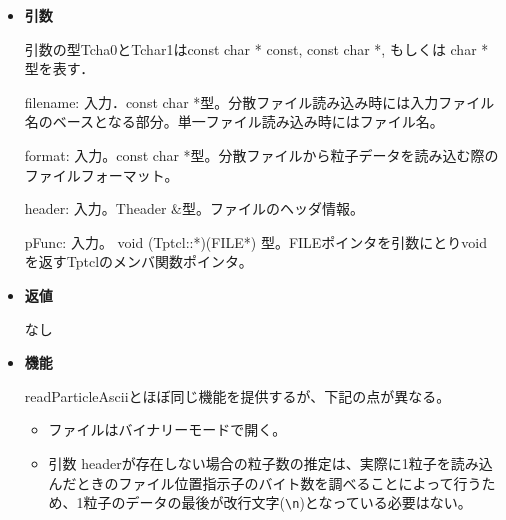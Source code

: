 \begin{itemize}

\item {\bf 引数}

引数の型Tcha0とTchar1はconst char * const, const char *, もしくは char
* 型を表す．

filename: 入力．const char *型。分散ファイル読み込み時には入力ファイル
名のベースとなる部分。単一ファイル読み込み時にはファイル名。

format: 入力。const char *型。分散ファイルから粒子データを読み込む際の
ファイルフォーマット。

header: 入力。Theader \&型。ファイルのヘッダ情報。

pFunc: 入力。 void (Tptcl::*)(FILE*) 型。FILEポインタを引数にとりvoid
を返すTptclのメンバ関数ポインタ。


\item {\bf 返値}

なし

\item {\bf 機能}

readParticleAsciiとほぼ同じ機能を提供するが、下記の点が異なる。
\begin{itemize}
\item ファイルはバイナリーモードで開く。
\item 引数 headerが存在しない場合の粒子数の推定は、実際に1粒子を読み込んだときのファイル位置指示子のバイト数を調べることによって行うため、1粒子のデータの最後が改行文字(\texttt{\textbackslash n})となっている必要はない。
\end{itemize}

\end{itemize}

\label{sec:writeParticleAscii}

